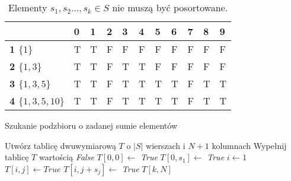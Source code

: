 \begin{table}[H]
	\centering
	\begin{tabular}{|l|l|l|l|l|l|l|l|l|l|l|}
		\hline
		& \multicolumn{1}{l|}{\textbf{0}} & \multicolumn{1}{l|}{\textbf{1}} & \multicolumn{1}{l|}{\textbf{2}} & \multicolumn{1}{l|}{\textbf{3}} & \multicolumn{1}{l|}{\textbf{4}} & \multicolumn{1}{l|}{\textbf{5}} & \multicolumn{1}{l|}{\textbf{6}} & \multicolumn{1}{l|}{\textbf{7}} & \multicolumn{1}{l|}{\textbf{8}} & \multicolumn{1}{l|}{\textbf{9}} \\ \hline
		\textbf{1 $\{1\}$} & \color{ForestGreen}T & \color{ForestGreen}T & F & F & F & F & F & F & F & F \\ \cline{1-1}
		\textbf{2 $\{1, 3\}$} & \color{ForestGreen}T & \color{ForestGreen}T & F & \color{ForestGreen}T & \color{ForestGreen}T & F & F & F & F & F \\ \cline{1-1}
		\textbf{3 $\{1, 3, 5\}$} & \color{ForestGreen}T & \color{ForestGreen}T & F & \color{ForestGreen}T & \color{ForestGreen}T & \color{ForestGreen}T & \color{ForestGreen}T & F & \color{ForestGreen}T & \color{ForestGreen}T \\ \cline{1-1}
		\textbf{4 $\{1, 3, 5, 10\}$} & \color{ForestGreen}T & \color{ForestGreen}T & F & \color{ForestGreen}T & \color{ForestGreen}T & \color{ForestGreen}T & \color{ForestGreen}T & F & \color{ForestGreen}T & \color{ForestGreen}T  \\ \cline{1-1}
		\hline
	\end{tabular}
	\caption{Elementy $s_1, s_2 \dots, s_k \in S$ nie muszą być posortowane.}
	\label{tab:problemnptrudny}
\end{table}

\begin{algorithm}[H]
	\caption{Szukanie podzbioru o zadanej sumie elementów}\label{Zadanie11}
	\begin{algorithmic}[1]
		\State Utwórz tablicę dwuwymiarową $T$ o $|S|$ wierszach i $N + 1$ kolumnach 
		\State Wypełnij tablicę $T$ wartością \textit{False}
		\State $T[0, 0] \gets $ \textit{True}
		\State $T[0, s_1] \gets $ \textit{True}
		\State $i \gets 1$
		\State $T[i, j] \gets \textit{True}$
		\State $T[i, j + s_j] \gets$ \textit{True}
		\EndIf
		\EndIf
		\EndFor 
		\EndFor
		\State \Return $T[k, N]$
		\EndProcedure 
	\end{algorithmic}
\end{algorithm}

